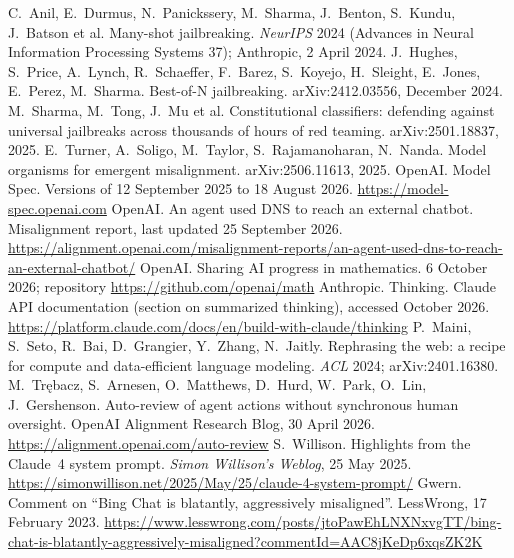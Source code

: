  C.~Anil, E.~Durmus, N.~Panickssery, M.~Sharma, J.~Benton, S.~Kundu, J.~Batson et al. Many-shot jailbreaking. \emph{NeurIPS} 2024 (Advances in Neural Information Processing Systems 37); Anthropic, 2 April 2024.
 J.~Hughes, S.~Price, A.~Lynch, R.~Schaeffer, F.~Barez, S.~Koyejo, H.~Sleight, E.~Jones, E.~Perez, M.~Sharma. Best-of-N jailbreaking. arXiv:2412.03556, December 2024.
 M.~Sharma, M.~Tong, J.~Mu et al. Constitutional classifiers: defending against universal jailbreaks across thousands of hours of red teaming. arXiv:2501.18837, 2025.
 E.~Turner, A.~Soligo, M.~Taylor, S.~Rajamanoharan, N.~Nanda. Model organisms for emergent misalignment. arXiv:2506.11613, 2025.
 OpenAI. Model Spec. Versions of 12 September 2025 to 18 August 2026. \url{https://model-spec.openai.com}
 OpenAI. An agent used DNS to reach an external chatbot. Misalignment report, last updated 25 September 2026. \url{https://alignment.openai.com/misalignment-reports/an-agent-used-dns-to-reach-an-external-chatbot/}
 OpenAI. Sharing AI progress in mathematics. 6 October 2026; repository \url{https://github.com/openai/math}
 Anthropic. Thinking. Claude API documentation (section on summarized thinking), accessed October 2026. \url{https://platform.claude.com/docs/en/build-with-claude/thinking}
 P.~Maini, S.~Seto, R.~Bai, D.~Grangier, Y.~Zhang, N.~Jaitly. Rephrasing the web: a recipe for compute and data-efficient language modeling. \emph{ACL} 2024; arXiv:2401.16380.
 M.~Tr{\k e}bacz, S.~Arnesen, O.~Matthews, D.~Hurd, W.~Park, O.~Lin, J.~Gershenson. Auto-review of agent actions without synchronous human oversight. OpenAI Alignment Research Blog, 30 April 2026. \url{https://alignment.openai.com/auto-review}
 S.~Willison. Highlights from the Claude~4 system prompt. \emph{Simon Willison's Weblog}, 25 May 2025. \url{https://simonwillison.net/2025/May/25/claude-4-system-prompt/}
 Gwern. Comment on ``Bing Chat is blatantly, aggressively misaligned''. LessWrong, 17 February 2023. \url{https://www.lesswrong.com/posts/jtoPawEhLNXNxvgTT/bing-chat-is-blatantly-aggressively-misaligned?commentId=AAC8jKeDp6xqsZK2K}
